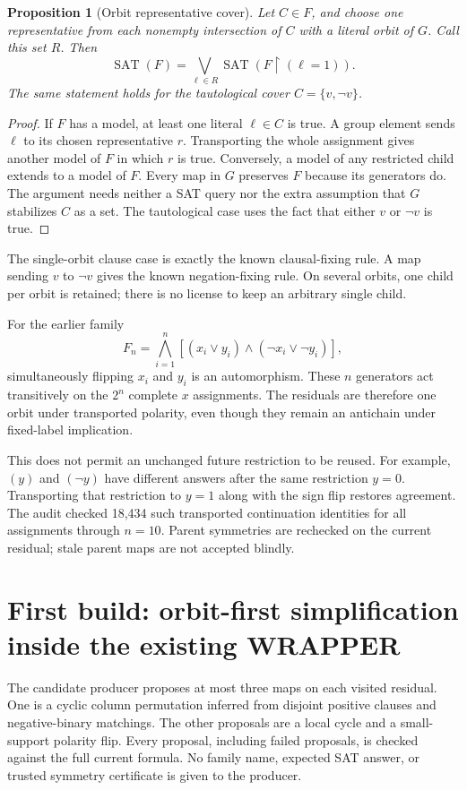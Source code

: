 \documentclass[11pt]{article}
\newtheorem{proposition}{Proposition}
\newcommand{\SAT}{\operatorname{SAT}}
\begin{document}
\begin{proposition}[Orbit representative cover]
Let $C\in F$, and choose one representative from each nonempty intersection of $C$ with a literal orbit of $G$. Call this set $R$. Then
\[
 \SAT(F)=\bigvee_{\ell\in R}\SAT(F\upharpoonright(\ell=1)).
\]
The same statement holds for the tautological cover $C=\{v,\neg v\}$.
\end{proposition}
\begin{proof}
If $F$ has a model, at least one literal $\ell\in C$ is true. A group element sends $\ell$ to its chosen representative $r$. Transporting the whole assignment gives another model of $F$ in which $r$ is true. Conversely, a model of any restricted child extends to a model of $F$. Every map in $G$ preserves $F$ because its generators do. The argument needs neither a SAT query nor the extra assumption that $G$ stabilizes $C$ as a set. The tautological case uses the fact that either $v$ or $\neg v$ is true.
\end{proof}

The single-orbit clause case is exactly the known clausal-fixing rule. A map sending $v$ to $\neg v$ gives the known negation-fixing rule. On several orbits, one child per orbit is retained; there is no license to keep an arbitrary single child.

For the earlier family
\[
 F_n=\bigwedge_{i=1}^n[(x_i\vee y_i)\wedge(\neg x_i\vee\neg y_i)],
\]
simultaneously flipping $x_i$ and $y_i$ is an automorphism. These $n$ generators act transitively on the $2^n$ complete $x$ assignments. The residuals are therefore one orbit under transported polarity, even though they remain an antichain under fixed-label implication.

This does not permit an unchanged future restriction to be reused. For example, $(y)$ and $(\neg y)$ have different answers after the same restriction $y=0$. Transporting that restriction to $y=1$ along with the sign flip restores agreement. The audit checked 18,434 such transported continuation identities for all assignments through $n=10$. Parent symmetries are rechecked on the current residual; stale parent maps are not accepted blindly.

\section{First build: orbit-first simplification inside the existing WRAPPER}
The candidate producer proposes at most three maps on each visited residual. One is a cyclic column permutation inferred from disjoint positive clauses and negative-binary matchings. The other proposals are a local cycle and a small-support polarity flip. Every proposal, including failed proposals, is checked against the full current formula. No family name, expected SAT answer, or trusted symmetry certificate is given to the producer.
\end{document}
